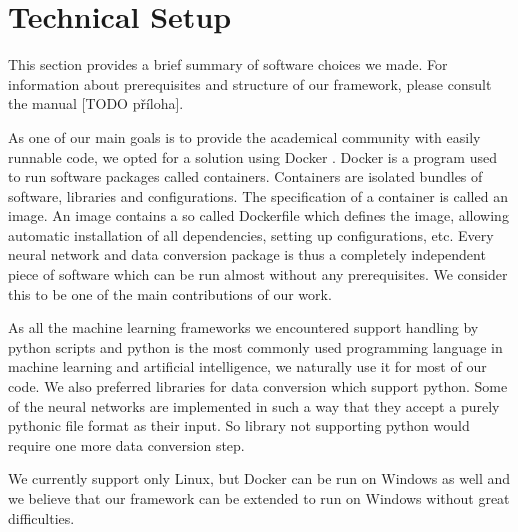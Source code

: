 \section{Technical Setup}
This section provides a brief summary of software choices we made. For information about prerequisites and structure of our framework, please consult the manual [TODO příloha]. \par
As one of our main goals is to provide the academical community with easily runnable code, we opted for a solution using Docker \cite{merkel_docker:_2014}. Docker is a program used to run software packages called containers. Containers are isolated bundles of software, libraries and configurations. The specification of a container is called an image. An image contains a so called Dockerfile which defines the image, allowing automatic installation of all dependencies, setting up configurations, etc. Every neural network and data conversion package is thus a completely independent piece of software which can be run almost without any prerequisites. We consider this to be one of the main contributions of our work. \par
As all the machine learning frameworks we encountered support handling by python scripts and python is the most commonly used programming language in machine learning and artificial intelligence, we naturally use it for most of our code. We also preferred libraries for data conversion which support python. Some of the neural networks are implemented in such a way that they accept a purely pythonic file format as their input. So library not supporting python would require one more data conversion step.\par
We currently support only Linux, but Docker can be run on Windows as well and we believe that our framework can be extended to run on Windows without great difficulties. 
